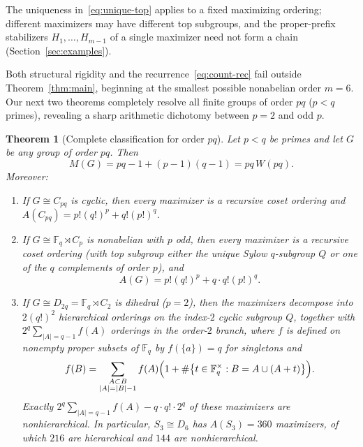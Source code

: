 \documentclass[11pt,reqno]{amsart}
\numberwithin{equation}{section}
\newtheorem{theorem}{Theorem}[section]
\theoremstyle{definition}
\theoremstyle{remark}
\newcommand{\F}{\mathbb{F}}
\begin{document}
The uniqueness in~\eqref{eq:unique-top} applies to a fixed maximizing ordering; different maximizers may have different top subgroups, and the proper-prefix stabilizers $H_1,\ldots,H_{m-1}$ of a single maximizer need not form a chain (Section~\ref{sec:examples}).

Both structural rigidity and the recurrence~\eqref{eq:count-rec} fail outside Theorem~\ref{thm:main}, beginning at the smallest possible nonabelian order $m=6$. Our next two theorems completely resolve all finite groups of order $pq$ ($p<q$ primes), revealing a sharp arithmetic dichotomy between $p=2$ and odd $p$.

\begin{theorem}[Complete classification for order $pq$]
\label{thm:pq}
Let $p<q$ be primes and let $G$ be any group of order $pq$. Then
\begin{equation}
\label{eq:pq-max}
M(G) = pq - 1 + (p-1)(q-1) = pq\,W(pq).
\end{equation}
Moreover:
\begin{enumerate}[label=(\alph*),leftmargin=2em]
\item If $G\cong C_{pq}$ is cyclic, then every maximizer is a recursive coset ordering and $A(C_{pq}) = p!(q!)^p + q!(p!)^q$.
\item If $G\cong \F_q \rtimes C_p$ is nonabelian with $p$ odd, then every maximizer is a recursive coset ordering (with top subgroup either the unique Sylow $q$-subgroup $Q$ or one of the $q$ complements of order $p$), and
\begin{equation}
\label{eq:pq-odd-count}
A(G) = p!(q!)^p + q\cdot q!(p!)^q.
\end{equation}
\item If $G\cong D_{2q} = \F_q \rtimes C_2$ is dihedral ($p=2$), then the maximizers decompose into $2(q!)^2$ hierarchical orderings on the index-$2$ cyclic subgroup $Q$, together with $2^q \sum_{|A|=q-1} f(A)$ orderings in the order-$2$ branch, where $f$ is defined on nonempty proper subsets of $\F_q$ by $f(\{a\})=q$ for singletons and
\begin{equation}
\label{eq:dihedral-dp}
f(B) = \sum_{\substack{A\subset B\\ |A|=|B|-1}} f(A)\Bigl(1 + \#\bigl\{t\in\F_q^\times : B = A\cup(A+t)\bigr\}\Bigr).
\end{equation}
Exactly $2^q\sum_{|A|=q-1} f(A) - q\cdot q!\cdot 2^q$ of these maximizers are nonhierarchical. In particular, $S_3\cong D_6$ has $A(S_3)=360$ maximizers, of which $216$ are hierarchical and $144$ are nonhierarchical.
\end{enumerate}
\end{theorem}
\end{document}
